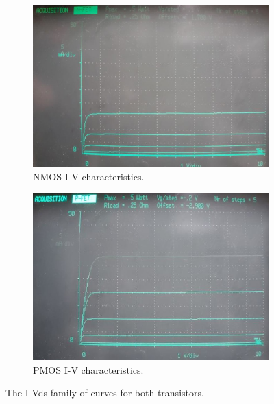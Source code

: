 \documentclass{report}
\begin{document}
\begin{figure}[H]
	\centering
	\begin{subfigure}{0.45\textwidth}
		\includegraphics[width=\linewidth]{familynfet}
		\caption{NMOS I-V characteristics.}
	\end{subfigure}
	\hfill
	\begin{subfigure}{0.45\textwidth}
		\includegraphics[width=\linewidth]{familypfet}
		\caption{PMOS I-V characteristics.}
	\end{subfigure}
	\caption{The I-Vds family of curves for both transistors.}
	\label{fig:families}
\end{figure}
\end{document}
